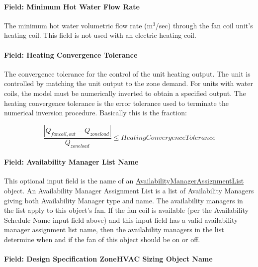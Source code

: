 \paragraph{Field: Minimum Hot Water Flow Rate}\label{field-minimum-hot-water-flow-rate-000}

The minimum hot water volumetric flow rate (m\(^{3}\)/sec) through the fan coil unit's heating coil. This field is not used with an electric heating coil.

\paragraph{Field: Heating Convergence Tolerance}\label{field-heating-convergence-tolerance-000}

The convergence tolerance for the control of the unit heating output. The unit is controlled by matching the unit output to the zone demand. For units with water coils, the model must be numerically inverted to obtain a specified output. The heating convergence tolerance is the error tolerance used to terminate the numerical inversion procedure. Basically this is the fraction:

\begin{equation}
\frac{{\left| {{Q_{fancoil,out}} - {Q_{zoneload}}} \right|}}{{{Q_{zoneload}}}} \le HeatingConvergenceTolerance
\end{equation}

\paragraph{Field: Availability Manager List Name}\label{field-availability-manager-list-name-002}

This optional input field is the name of an \hyperref[availabilitymanagerassignmentlist]{AvailabilityManagerAssignmentList} object. An Availability Manager Assignment List is a list of Availability Managers giving both Availability Manager type and name. The availability managers in the list apply to this object's fan. If the fan coil is available (per the Availability Schedule Name input field above) and this input field has a valid availability manager assignment list name, then the availability managers in the list determine when and if the fan of this object should be on or off.

\paragraph{Field: Design Specification ZoneHVAC Sizing Object Name}\label{field-design-specification-zonehvac-sizing-object-name-1}

